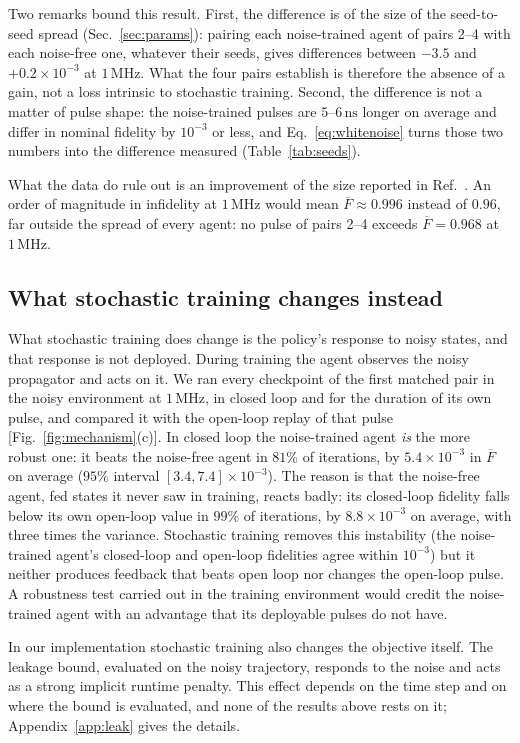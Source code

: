 \documentclass[aps,prx,twocolumn,superscriptaddress,nofootinbib,amsmath,amssymb,floatfix]{revtex4-2}
\newcommand{\Fbar}{\overline{F}}
\newcommand{\ns}{\,\mathrm{ns}}
\newcommand{\MHz}{\,\mathrm{MHz}}
\begin{document}
Two remarks bound this result. First, the difference is of the size of the seed-to-seed spread
(Sec.~\ref{sec:params}): pairing each noise-trained agent of pairs 2--4 with each noise-free one, whatever
their seeds, gives differences between $-3.5$ and $+0.2\times10^{-3}$ at $1\MHz$. What the four pairs
establish is therefore the absence of a gain, not a loss intrinsic to stochastic training. Second, the
difference is not a matter of pulse shape: the noise-trained pulses are $5$--$6\ns$ longer on average and
differ in nominal fidelity by $10^{-3}$ or less, and Eq.~\eqref{eq:whitenoise} turns those two numbers
into the difference measured (Table~\ref{tab:seeds}).

What the data do rule out is an improvement of the size reported in Ref.~\cite{Niu2019}. An order of
magnitude in infidelity at $1\MHz$ would mean $\Fbar\approx0.996$ instead of $0.96$, far outside the spread
of every agent: no pulse of pairs 2--4 exceeds $\Fbar=0.968$ at $1\MHz$.

\subsection{What stochastic training changes instead}
\label{sec:noisyleak}

What stochastic training does change is the policy's response to noisy states, and that response is not
deployed. During training the agent observes the noisy propagator and acts on it. We ran every checkpoint of the first matched pair
in the noisy environment at $1\MHz$, in closed loop and for the duration of its own pulse, and compared it
with the open-loop replay of that pulse [Fig.~\ref{fig:mechanism}(c)]. In closed loop the noise-trained
agent \emph{is} the more robust one: it beats the noise-free agent in $81\%$ of iterations, by
$5.4\times10^{-3}$ in $\Fbar$ on average ($95\%$ interval $[3.4,7.4]\times10^{-3}$). The reason is that the
noise-free agent, fed states it never saw in training, reacts badly: its closed-loop fidelity falls below its
own open-loop value in $99\%$ of iterations, by $8.8\times10^{-3}$ on average, with three times the
variance. Stochastic training removes this instability (the noise-trained agent's closed-loop and
open-loop fidelities agree within $10^{-3}$) but it neither produces feedback that beats open loop nor
changes the open-loop pulse. A robustness test carried out in the training environment would credit the
noise-trained agent with an advantage that its deployable pulses do not have.

In our implementation stochastic training also changes the objective itself. The leakage bound, evaluated
on the noisy trajectory, responds to the noise and acts as a strong implicit runtime penalty. This effect
depends on the time step and on where the bound is evaluated, and none of the results above rests on it;
Appendix~\ref{app:leak} gives the details.
\end{document}
